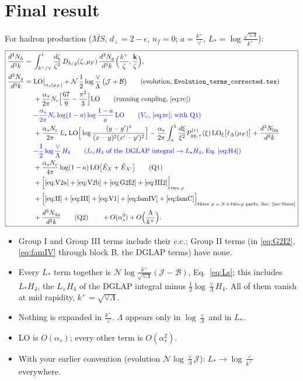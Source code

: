 \documentclass[10pt]{article}
\numberwithin{equation}{section}
\newcommand{\new}[1]{{\color{blue}#1}}
\newcommand{\Lv}{L_{\vee}}
\newcommand{\Ls}{L_{*}}
\newcommand{\JJ}{\mathcal J}
\newcommand{\BB}{\mathcal B}
\newcommand{\NN}{\mathcal N}
\newcommand{\Eh}{\hat E}
\newcommand{\LOx}[1]{{\rm LO}_\xi\big[#1\big]}
\begin{document}
\section{Final result}\label{sec:final}
For hadron production ($\overline{MS}$, $d_\perp=2-\epsilon$, $n_f=0$; $a=\frac{k^+}{\vee}$, $\Ls=\log\frac{\sqrt{\vee\Lambda}}{k^+}$):
\begin{equation}
\boxed{\begin{aligned}
\frac{d^3N_h}{d^3k}={}&\int_{k^+/\vee}^1\frac{d\zeta}{\zeta^3}\,D_{h/g}(\zeta,\mu_F)\,\frac{d^3N_g}{d^3k}\Big(\frac{k^+}{\zeta},\frac{\mathbf k}{\zeta}\Big),\\
\frac{d^3N_g}{d^3k}={}&{\rm LO}\big|_{\alpha_s(\mu_F)}+\NN\,\frac12\log\frac{\vee}{\Lambda}\,\big(\JJ+\BB\big)
\qquad\text{(evolution, \texttt{Evolution\_terms\_corrected.tex})}\\
&+\frac{\alpha_s}{2\pi}N_c\Big[\frac{67}{9}-\frac{\pi^2}{3}\Big]{\rm LO}
\qquad\text{(running coupling, \eqref{eq:rc})}\\
&\new{-\frac{\alpha_s}{2\pi}N_c\log(1-a)\log\frac{1-a}{a}\,{\rm LO}\qquad\text{($V_\vee$, \eqref{eq:rc}; with Q1)}}\\
&+\frac{\alpha_sN_c}{2\pi}\,\Ls\,{\rm LO}\Big[\log\frac{(y-y')^4}{(x-y)^2(x'-y')^2}\Big]
-\frac{\alpha_s}{2\pi}\int_{a}^1\frac{d\xi}{\xi^2}P^{(r)}_{gg,+}(\xi)\,\LOx{\ell_\Delta(\mu_F)}+\frac{d^3N_{\rm lin}}{d^3k}\\
&\new{-\frac12\log\frac{\vee}{\Lambda}\,H_4\qquad\text{($\Lv H_4$ of the DGLAP integral $\to\Ls H_4$, Eq.~\eqref{eq:H4})}}\\
&+\frac{\alpha_sN_c}{4\pi}\log(1-a)\,{\rm LO}\big[\Eh_X+\Eh_{X'}\big]
\qquad\text{(Q1)}\\
&+\Big[\eqref{eq:V2a}+\eqref{eq:V2b}+\eqref{eq:G2I2}+\eqref{eq:III2}\Big]_{\text{two }\rho}\\
&+\Big[\eqref{eq:II}+\eqref{eq:III}+\eqref{eq:V1}+\eqref{eq:famIV}+\eqref{eq:famC}\Big]_{\text{three }\rho\;=\;S\,+\,\text{two-}\rho\text{ parts, Sec.~\ref{sec:three}}}\\
&+\frac{d^3N_{4\rho}}{d^3k}\qquad\text{(Q2)}\qquad+O(\alpha_s^3)+O\Big(\frac{\Lambda}{k^+}\Big).
\end{aligned}}
\label{eq:final}
\end{equation}
\begin{itemize}
\item Group I and Group III terms include their c.c.; Group II terms (in \eqref{eq:G2I2}, \eqref{eq:famIV} through block B, the DGLAP terms) have none.
\item Every $\Ls$ term together is $\NN\log\frac{k^+}{\sqrt{\vee\Lambda}}(\JJ-\BB)$, Eq.~\eqref{eq:Ls}\new{; this includes $\Ls H_4$, the $\Lv H_4$ of the DGLAP integral minus $\frac12\log\frac\vee\Lambda H_4$}. All of them vanish at mid rapidity, $k^+=\sqrt{\vee\Lambda}$.
\item Nothing is expanded in $\frac{k^+}{\vee}$. $\Lambda$ appears only in $\log\frac{\vee}{\Lambda}$ and in $\Ls$.
\item LO is $O(\alpha_s)$; every other term is $O(\alpha_s^2)$.
\item With your earlier convention (evolution $\NN\log\frac\vee\Lambda\JJ$): $\Ls\to\log\frac{\vee}{k^+}$ everywhere.
\end{itemize}
\end{document}
